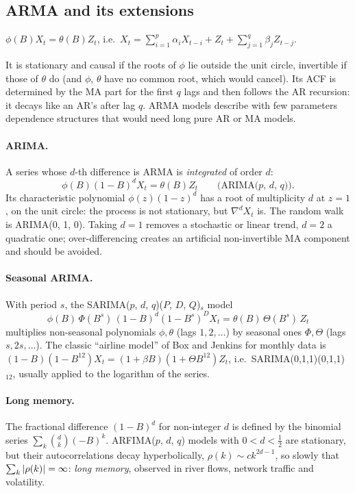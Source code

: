 \begin{notechapter}
\section{ARMA and its extensions}\label{linear-time-series:sec:arma}

\begin{definition}[ARMA($p$, $q$)]
$\phi(B)X_t = \theta(B)Z_t$, i.e.\ $X_t = \sum_{i=1}^p\alpha_iX_{t-i} + Z_t + \sum_{j=1}^q\beta_jZ_{t-j}$.
\end{definition}

It is stationary and causal if the roots of $\phi$ lie outside the unit circle, invertible if
those of $\theta$ do (and $\phi$, $\theta$ have no common root, which would cancel). Its ACF is
determined by the MA part for the first $q$ lags and then follows the AR recursion: it
decays like an AR's after lag $q$. ARMA models describe with few parameters
dependence structures that would need long pure AR or MA models.

\paragraph{ARIMA.} A series whose $d$-th difference is ARMA is \emph{integrated} of order $d$:
\[
  \phi(B)(1 - B)^dX_t = \theta(B)Z_t\qquad\text{(ARIMA($p$, $d$, $q$))}.
\]
Its characteristic polynomial $\phi(z)(1 - z)^d$ has a root of multiplicity $d$ at $z = 1$, on the unit circle:
the process is not stationary, but $\nabla^dX_t$ is. The random walk is ARIMA(0, 1, 0). Taking
$d = 1$ removes a stochastic or linear trend, $d = 2$ a quadratic one; over-differencing creates
an artificial non-invertible MA component and should be avoided.

\paragraph{Seasonal ARIMA.} With period $s$, the SARIMA($p$, $d$, $q$)($P$, $D$, $Q$)$_s$ model
\[
  \phi(B)\,\Phi(B^s)\,(1 - B)^d(1 - B^s)^DX_t = \theta(B)\,\Theta(B^s)\,Z_t
\]
multiplies non-seasonal polynomials $\phi, \theta$ (lags $1, 2,\dots$) by seasonal ones $\Phi, \Theta$ (lags $s, 2s,\dots$).
The classic ``airline model'' of Box and Jenkins for monthly data is
$(1 - B)(1 - B^{12})X_t = (1 + \beta B)(1 + \Theta B^{12})Z_t$, i.e.\ SARIMA(0,1,1)(0,1,1)$_{12}$, usually applied to the
logarithm of the series.

\paragraph{Long memory.} The fractional difference $(1 - B)^d$ for non-integer $d$ is defined by the
binomial series $\sum_k\binom dk(-B)^k$. ARFIMA($p$, $d$, $q$) models with $0<d<\frac12$ are stationary, but their
autocorrelations decay hyperbolically, $\rho(k)\sim ck^{2d-1}$, so slowly that $\sum_k\left|\rho(k)\right| = \infty$: \emph{long
memory}, observed in river flows, network traffic and volatility.


\end{notechapter}
